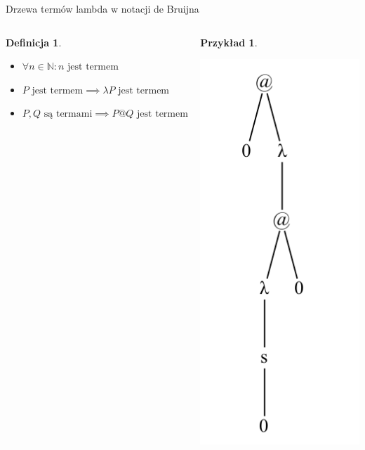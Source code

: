\documentclass[final]{beamer}
\theoremstyle{bluetheorem}
\theoremstyle{bluetheorem}
\newtheorem{mydefinition}[mytheorem]{Definicja}
\theoremstyle{greentheorem}
\newtheorem{myexample}[mytheorem]{Przykład}
\begin{document}
\begin{frame}{Drzewa termów lambda w notacji de Bruijna}
    \begin{columns}
        \begin{mydefinition}
            \begin{itemize}
                \item \(\forall n \in \mathbb{N}: n \text{ jest termem}\)
                \item \(P \text{ jest termem} \implies \lambda P \text{ jest termem}\)
                \item \(P, Q \text{ są termami} \implies P @ Q \text{ jest termem}\)
            \end{itemize}
        \end{mydefinition}

        \begin{myexample}
            \begin{center}
                \includegraphics{lambda_001.png}
            \end{center}
        \end{myexample}
    \end{columns}
\end{frame}
\end{document}
